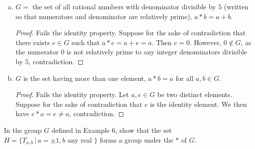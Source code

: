 \documentclass[addpoints, 11pt]{exam}
\newenvironment{question}[1]{\smallskip\noindent\color{crimson}{\bf Question #1.}}{}
\begin{document}
\begin{enumerate}[(a)]
\begin{proof}
        Since $a * 0 = 0 * a = a$, $e = 0 \in G$ is the identity element.

        Finally, we show the inverse property. Let $b = \frac{-a}{a + 1}$. Since 
        \[
            a * b = b * a = a + \frac{-a}{a + 1} + a \cdot \frac{-a}{a + 1} = \frac{a^2 + a - a - a^2}{a + 1} = 0,
        \]
        for all $a \in G$, $a$ has an inverse $b = \frac{-a}{a + 1} \in G$.

        Since all four properties are met, $G$ with $*$ form a group.
    \end{proof}

    \color{crimson}
    \item  $G = $ the set of all rational numbers with denominator divisible by $5$ (written so that numerators and denominator are relatively prime), $a * b = a + b$.
    \normalcolor
    
    \begin{proof}
        Fails the identity property. Suppose for the sake of contradiction that there exists $e \in G$ such that $a * e = a + e = a$. Then $e = 0$. However, $0 \notin G$, as the numerator $0$ is not relatively prime to any integer denominators divisible by $5$, contradiction.
    \end{proof}

    \color{crimson}
    \item  $G$ is the set having more than one element, $a * b = a$ for all $a, b \in G$.
    \normalcolor
    
    \begin{proof}
        Fails the identity property. Let $a, e \in G$ be two distinct elements. Suppose for the sake of contradiction that $e$ is the identity element. We then have $e * a = e \neq a$, contradiction.
    \end{proof}
\end{enumerate}

\newpage

\begin{question}{2.1.2}
    In the group $G$ defined in Example 6, show that the set $H = \{T_{a,b} \, | \, a = \pm 1, b \text{ any real }\}$ forms a group under the $*$ of $G$.
\end{question}
\end{document}
